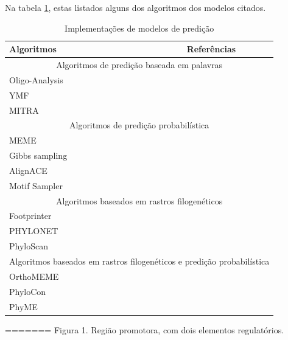 Na tabela \ref{tab:metodos_busca_elementos}, estas listados alguns dos algoritmos dos modelos citados.

\begin{table}[h!]
\begin{center}
  \begin{tabular}{| l | c | }
    \hline
    Algoritmos     & Referências       \\ \hline \hline

    \multicolumn{2}{|c|}{Algoritmos de predição baseada em palavras}  \\ \hline

    Oligo-Analysis & \cite{Helden1998} \\ \hline
    YMF            & \cite{Sinha2003}  \\ \hline
    MITRA          & \cite{Eskin2002}  \\ \hline

    \multicolumn{2}{|c|}{Algoritmos de predição probabilística}       \\ \hline

    MEME           & \cite{Bailey2006}   \\ \hline
    Gibbs sampling & \cite{Lawrence1993} \\ \hline
    AlignACE       & \cite{Roth1998}     \\ \hline
    Motif Sampler  & \cite{Thijs2002}    \\ \hline

    \multicolumn{2}{|c|}{Algoritmos baseados em rastros filogenéticos} \\ \hline

    Footprinter    & \cite{Blanchette2002} \\ \hline
    PHYLONET       & \cite{Wang2005}       \\ \hline
    PhyloScan      & \cite{Carmack2007}    \\ \hline

    \multicolumn{2}{|c|}{Algoritmos baseados em rastros filogenéticos e predição probabilística}             \\ \hline

    OrthoMEME      & \cite{Carmack2007}  \\ \hline
    PhyloCon       & \cite{Wang2003}     \\ \hline
    PhyME          & \cite{Sinha2004}    \\ \hline

    \hline

  \end{tabular}
\end{center}
  \caption{Implementações de modelos de predição}
   \label{tab:metodos_busca_elementos}
\end{table}
=======
Figura 1. Região promotora, com dois elementos regulatórios.


